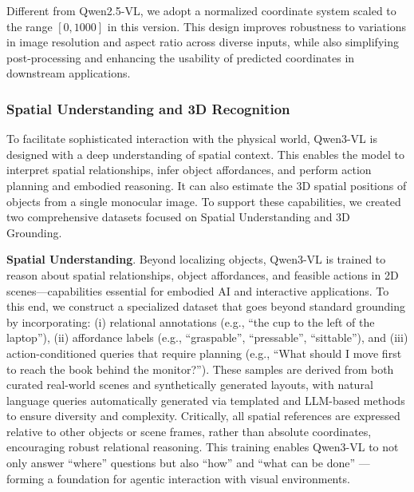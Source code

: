 \documentclass{article} %
\begin{document}
Different from Qwen2.5-VL, we adopt a normalized coordinate system scaled to the range $[0,1000]$ in this version. This design improves robustness to variations in image resolution and aspect ratio across diverse inputs, while also simplifying post-processing and enhancing the usability of predicted coordinates in downstream applications.

\subsubsection{Spatial Understanding and 3D Recognition}
To facilitate sophisticated interaction with the physical world, Qwen3-VL is designed with a deep understanding of spatial context. This enables the model to interpret spatial relationships, infer object affordances, and perform action planning and embodied reasoning. It can also estimate the 3D spatial positions of objects from a single monocular image. To support these capabilities, we created two comprehensive datasets focused on Spatial Understanding and 3D Grounding.

\textbf{Spatial Understanding}. 
Beyond localizing objects, Qwen3-VL is trained to reason about spatial relationships, object affordances, and feasible actions in 2D scenes—capabilities essential for embodied AI and interactive applications. To this end, we construct a specialized dataset that goes beyond standard grounding by incorporating:
(i) relational annotations (e.g., “the cup to the left of the laptop”),
(ii) affordance labels (e.g., “graspable”, “pressable”, “sittable”), and
(iii) action-conditioned queries that require planning (e.g., “What should I move first to reach the book behind the monitor?”).
These samples are derived from both curated real-world scenes and synthetically generated layouts, with natural language queries automatically generated via templated and LLM-based methods to ensure diversity and complexity. Critically, all spatial references are expressed relative to other objects or scene frames, rather than absolute coordinates, encouraging robust relational reasoning.
This training enables Qwen3-VL to not only answer “where” questions but also “how” and “what can be done” — forming a foundation for agentic interaction with visual environments.
\end{document}
